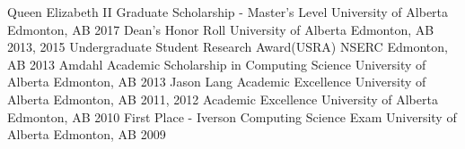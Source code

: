 \begin{cvhonors}
    \cvhonor
    {Queen Elizabeth II Graduate Scholarship - Master's Level}
    {University of Alberta}
    {Edmonton, AB}
    {2017}
    \cvhonor
    {Dean's Honor Roll}
    {University of Alberta}
    {Edmonton, AB}
    {2013, 2015}
    \cvhonor
    {Undergraduate Student Research Award(USRA)}
    {NSERC}
    {Edmonton, AB}
    {2013}
    \cvhonor
    {Amdahl Academic Scholarship in Computing Science}
    {University of Alberta}
    {Edmonton, AB}
    {2013}
    \cvhonor
    {Jason Lang Academic Excellence}
    {University of Alberta}
    {Edmonton, AB}
    {2011, 2012}
    \cvhonor
    {Academic Excellence}
    {University of Alberta}
    {Edmonton, AB}
    {2010}
    \cvhonor
    {First Place - Iverson Computing Science Exam}
    {University of Alberta}
    {Edmonton, AB}
    {2009}
\end{cvhonors}

